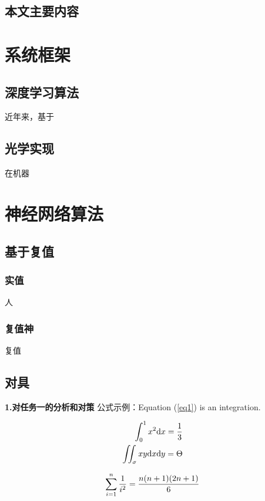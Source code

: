 \documentclass[no-math,bwprint]{YangThesis}
\begin{document}
\subsection{本文主要内容}
\newpage
\section{系统框架}

\subsection{深度学习算法}

近年来，基于
\subsection{光学实现}
在机器\textsuperscript{\cite{ShenDeep}}

\newpage
\section{神经网络算法}

\subsection{基于复值}

\subsubsection{实值}

人
\subsubsection{复值神}

复值
\subsection{对具}

{\bfseries\song1.对任务一的分析和对策}
公式示例：Equation (\ref{eq1}) is an integration.

\begin{equation}\label{eq1}
\begin{split}
\int_0^1 x^2 \mathrm{d} x = \frac{1}{3}\\
\iint_\sigma xy\mathrm{d} x \mathrm{d} y = \Theta
\end{split}
\end{equation}

\begin{equation}
\displaystyle\sum\limits_{i=1}^{n} \frac{1}{i^2}=\frac{n(n+1)(2n+1)}{6}
\end{equation}
\end{document}
